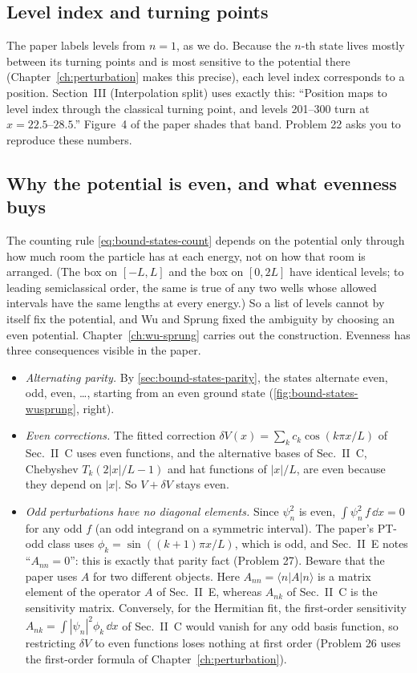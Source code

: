 \subsection{Level index and turning points}

The paper labels levels from $n=1$, as we do. Because the $n$-th state lives mostly between its turning points and is most sensitive to the potential there (Chapter~\ref{ch:perturbation} makes this precise), each level index corresponds to a position. Section~III (Interpolation split) uses exactly this: ``Position maps to level index through the classical turning point, and levels 201--300 turn at $x=22.5$--$28.5$.'' Figure~4 of the paper shades that band. Problem 22 asks you to reproduce these numbers.

\subsection{Why the potential is even, and what evenness buys}

The counting rule \cref{eq:bound-states-count} depends on the potential only through how much room the particle has at each energy, not on how that room is arranged. (The box on $[-L,L]$ and the box on $[0,2L]$ have identical levels; to leading semiclassical order, the same is true of any two wells whose allowed intervals have the same lengths at every energy.) So a list of levels cannot by itself fix the potential, and Wu and Sprung \cite{wusprung} fixed the ambiguity by choosing an even potential. Chapter~\ref{ch:wu-sprung} carries out the construction. Evenness has three consequences visible in the paper.
\begin{itemize}
\item \emph{Alternating parity.} By \cref{sec:bound-states-parity}, the states alternate even, odd, even, \dots, starting from an even ground state (\cref{fig:bound-states-wusprung}, right).
\item \emph{Even corrections.} The fitted correction $\delta V(x)=\sum_k c_k\cos(k\pi x/L)$ of Sec.~II~C uses even functions, and the alternative bases of Sec.~II~C, Chebyshev $T_k(2|x|/L-1)$ and hat functions of $|x|/L$, are even because they depend on $|x|$. So $V+\delta V$ stays even.
\item \emph{Odd perturbations have no diagonal elements.} Since $\psi_n^2$ is even, $\int\psi_n^2\,f\,\dd x=0$ for any odd $f$ (an odd integrand on a symmetric interval). The paper's PT-odd class uses $\phi_k=\sin((k+1)\pi x/L)$, which is odd, and Sec.~II~E notes ``$A_{nn}=0$'': this is exactly that parity fact (Problem 27). Beware that the paper uses $A$ for two different objects. Here $A_{nn}=\langle n|A|n\rangle$ is a matrix element of the operator $A$ of Sec.~II~E, whereas $A_{nk}$ of Sec.~II~C is the sensitivity matrix. Conversely, for the Hermitian fit, the first-order sensitivity $A_{nk}=\int|\psi_n|^2\phi_k\,\dd x$ of Sec.~II~C would vanish for any odd basis function, so restricting $\delta V$ to even functions loses nothing at first order (Problem 26 uses the first-order formula of Chapter~\ref{ch:perturbation}).
\end{itemize}


